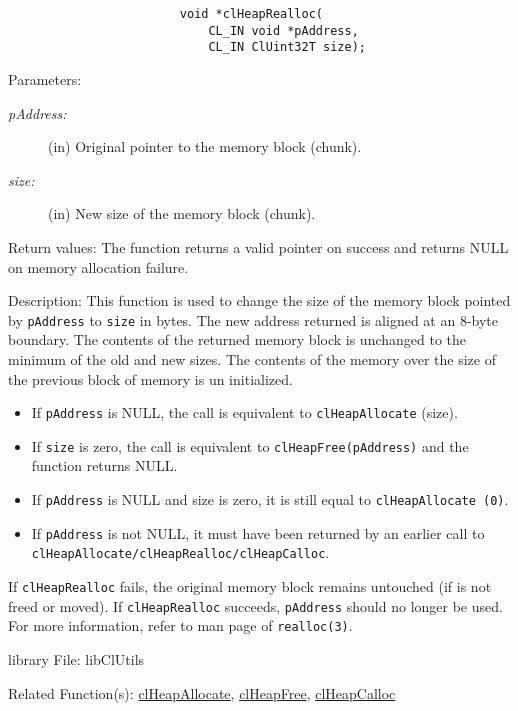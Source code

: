 \begin{flushleft}
\begin{Desc}
\footnotesize\begin{verbatim}
                		void *clHeapRealloc(
                		    CL_IN void *pAddress,
                		    CL_IN ClUint32T size);
\end{verbatim}
\normalsize
\end{Desc}
\begin{Desc}
\item[Parameters:]
\begin{description}
\item[{\em p\-Address:}](in) Original pointer to the memory block (chunk).
\item[{\em size:}](in) New size of the memory block (chunk).
\end{description}
\end{Desc}
\begin{Desc}
\item[Return values:]
 The function returns a valid pointer on success and returns NULL on memory allocation failure.
\end{Desc}
\begin{Desc}
\item[Description:] This function is used to change the size of the memory block pointed by {\tt{pAddress}} to {\tt{size}} in bytes. The new address
returned is aligned at an 8-byte boundary. The contents of the
returned memory block is unchanged to the minimum of the old and new
sizes. The contents of the memory over the size of the previous block of memory
is un initialized.
\begin{itemize}
\item If {\tt{pAddress}} is NULL, the call is equivalent to {\tt{clHeapAllocate}} (size).
\item If {\tt{size}} is zero, the call is equivalent to {\tt{clHeapFree(pAddress)}} and the function returns NULL.
\item If {\tt{pAddress}} is NULL and size is zero, it is still equal to {\tt{clHeapAllocate (0)}}.
\item If {\tt{pAddress}} is not NULL, it must have been returned by an earlier call to {\tt{clHeapAllocate/clHeapRealloc/clHeapCalloc}}.
\end{itemize}
\par
If {\tt{clHeapRealloc}} fails, the original memory block remains
untouched (if is not freed or moved). If {\tt{clHeapRealloc}}
succeeds, {\tt{pAddress}} should no longer be used. For more
information, refer to man page of {\tt{realloc(3)}}.
\end{Desc}
\begin{Desc}
\item[library File:]lib\-Cl\-Utils\end{Desc}
\begin{Desc}
\item[Related Function(s):]\hyperlink{pageheap128}{clHeapAllocate}, \hyperlink{pageheap130}{clHeapFree}, \hyperlink{pageheap130}{clHeapCalloc} \end{Desc}
\newpage



\end{flushleft}
